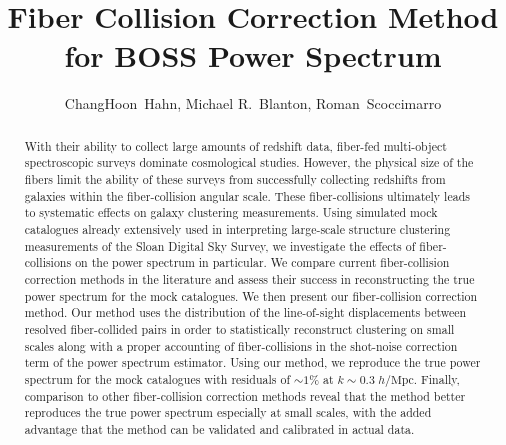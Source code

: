 \documentclass{emulateapj}
\begin{document}
\title{Fiber Collision Correction Method for BOSS Power Spectrum} 

\author{ChangHoon~Hahn, 
Michael R.~Blanton, 
Roman~Scoccimarro} 

\begin{abstract}
With their ability to collect large amounts of redshift data, fiber-fed multi-object spectroscopic surveys dominate cosmological studies. However, the physical size of the fibers limit the ability of these surveys from successfully collecting redshifts from galaxies within the fiber-collision angular scale. These fiber-collisions ultimately leads to systematic effects on galaxy clustering measurements. Using simulated mock catalogues already extensively used in interpreting large-scale structure clustering measurements of the Sloan Digital Sky Survey, we investigate the effects of fiber-collisions on the power spectrum in particular. We compare current fiber-collision correction methods in the literature and assess their success in reconstructing the true power spectrum for the mock catalogues. We then present our fiber-collision correction method. Our method uses the distribution of the line-of-sight displacements between resolved fiber-collided pairs in order to statistically reconstruct clustering on small scales along with a proper accounting of fiber-collisions in the shot-noise correction term of the power spectrum estimator. Using our method, we reproduce the true power spectrum for the mock catalogues with residuals of $\sim 1\%$ at $k \sim 0.3 \; h/\mathrm{Mpc}$. Finally, comparison to other fiber-collision correction methods reveal that the method better reproduces the true power spectrum especially at small scales, with the added advantage that the method can be validated and calibrated in actual data. 
\end{abstract}
\end{document}
